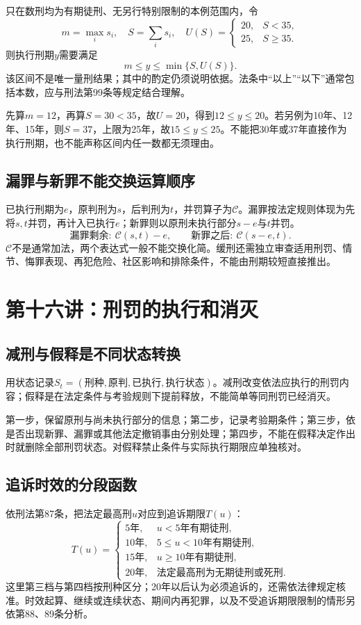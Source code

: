 只在数刑均为有期徒刑、无另行特别限制的本例范围内，令
\[
 m=\max_i s_i,\quad S=\sum_i s_i,\quad
 U(S)=\begin{cases}20,&S<35,\\25,&S\ge35.\end{cases}
\]
则执行刑期$y$需要满足
\[
 m\le y\le\min\{S,U(S)\}.
\]
该区间不是唯一量刑结果；其中的酌定仍须说明依据。法条中“以上”“以下”通常包括本数，应与刑法第99条等规定结合理解。

先算$m=12$，再算$S=30<35$，故$U=20$，得到$12\le y\le20$。若另例为10年、12年、15年，则$S=37$，上限为25年，故$15\le y\le25$。不能把30年或37年直接作为执行刑期，也不能声称区间内任一数都无须理由。

\subsection{漏罪与新罪不能交换运算顺序}
已执行刑期为$e$，原判刑为$s$，后判刑为$t$，并罚算子为$\mathcal C$。漏罪按法定规则体现为先将$s,t$并罚，再计入已执行$e$；新罪则以原刑未执行部分$s-e$与$t$并罚。
\[
 \text{漏罪剩余}:\ \mathcal C(s,t)-e,
 \qquad
 \text{新罪之后}:\ \mathcal C(s-e,t).
\]
$\mathcal C$不是通常加法，两个表达式一般不能交换化简。缓刑还需独立审查适用刑罚、情节、悔罪表现、再犯危险、社区影响和排除条件，不能由刑期较短直接推出。


\section{第十六讲：刑罚的执行和消灭}
\subsection{减刑与假释是不同状态转换}
用状态记录$S_t=(\text{刑种},\text{原判},\text{已执行},\text{执行状态})$。减刑改变依法应执行的刑罚内容；假释是在法定条件与考验规则下提前释放，不能简单等同刑罚已经消灭。

第一步，保留原刑与尚未执行部分的信息；第二步，记录考验期条件；第三步，依是否出现新罪、漏罪或其他法定撤销事由分别处理；第四步，不能在假释决定作出时就删除全部刑罚状态。对假释禁止条件与实际执行期限应单独核对。

\subsection{追诉时效的分段函数}
依刑法第87条，把法定最高刑$u$对应到追诉期限$T(u)$：
\[
 T(u)=\begin{cases}
 5\text{年},&u<5\text{年有期徒刑},\\
 10\text{年},&5\le u<10\text{年有期徒刑},\\
 15\text{年},&u\ge10\text{年有期徒刑},\\
 20\text{年},&\text{法定最高刑为无期徒刑或死刑}.
 \end{cases}
\]
这里第三档与第四档按刑种区分；20年以后认为必须追诉的，还需依法律规定核准。时效起算、继续或连续状态、期间内再犯罪，以及不受追诉期限限制的情形另依第88、89条分析。

